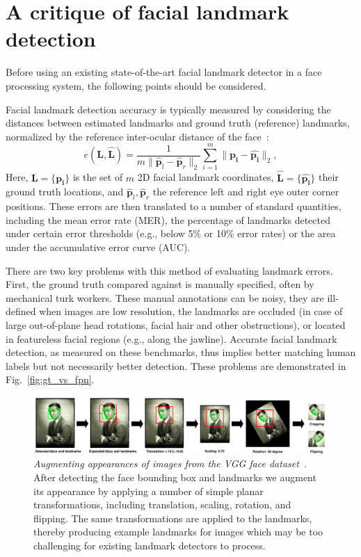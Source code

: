\documentclass[10pt,twocolumn,letterpaper]{article}
\newcommand{\minisection}[1]{\vspace{1mm}\noindent{\bf #1}}
\begin{document}
\section{A critique of facial landmark detection}\label{sec:critique}
Before using an existing state-of-the-art facial landmark detector in a face processing system, the following points should be considered. 


\minisection{Landmark detection accuracy measures.} Facial landmark detection accuracy is typically measured by considering the distances between estimated landmarks and ground truth (reference) landmarks, normalized by the reference inter-ocular distance of the face~\cite{dantone2012real}:
\begin{equation}
{e}(\mathbf{L},\hat{\mathbf{L}})= \frac{1}{m\|{\hat{\mathbf{p}}}_{l}-{\hat{\mathbf{p}}}_{r}\|_2} \sum_{i=1}^{m} \| \mathbf{p_i} - \hat{\mathbf{p_i}} \|_2,\label{eq:error}
\end{equation}
\noindent Here, $\mathbf{L} = \{\mathbf{p_i}\}$ is the set of $m$ 2D facial landmark coordinates, $\hat{\mathbf{L}} = \{\hat{\mathbf{p_i}}\} $ their ground truth locations, and ${\hat{\mathbf{p}}}_{l}, {\hat{\mathbf{p}}}_{r}$ the reference left and right eye outer corner positions. These errors are then translated to a number of standard quantities, including the mean error rate (MER), the percentage of landmarks detected under certain error thresholds (e.g., below 5\% or 10\% error rates) or the area under the accumulative error curve (AUC). 

There are two key problems with this method of evaluating landmark errors. First, the ground truth compared against is manually specified, often by mechanical turk workers. These manual annotations can be noisy, they are ill-defined when images are low resolution, the landmarks are occluded (in case of large out-of-plane head rotations, facial hair and other obstructions), or located in featureless facial regions (e.g., along the jawline). Accurate facial landmark detection, as measured on these benchmarks, thus implies better matching human labels but not necessarily better detection. These problems are demonstrated in Fig.~\ref{fig:gt_vs_fpn}.

\begin{figure}[t]
\centering
\includegraphics[width=\linewidth]{figures/perturbation_diagram_v2.jpg}
\caption{
{\em Augmenting appearances of images from the VGG face dataset~\cite{Parkhi15}.} After detecting the face bounding box and landmarks we augment its appearance by applying a number of simple planar transformations, including translation, scaling, rotation, and flipping. The same transformations are applied to the landmarks, thereby producing example  landmarks for images which may be too challenging for existing landmark detectors to process.\vspace{-3mm}}\label{fig:perturb}
\end{figure}
\end{document}
